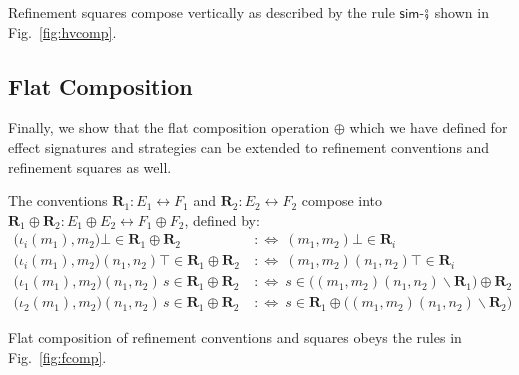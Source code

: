 \documentclass[acmsmall,screen,review,nonacm]{acmart}
\newcommand{\kw}[1]{\ensuremath{ \mathsf{#1} }}
\begin{document}
\begin{theorem} \label{thm:vcomp}
Refinement squares compose vertically
as described by the rule $\kw{sim}$-$\fatsemi$
shown in Fig.~\ref{fig:hvcomp}.
\end{theorem}


\subsection{Flat Composition} %

Finally,
we show that the flat composition operation $\oplus$
which we have defined for effect signatures and strategies
can be extended to refinement conventions and refinement squares as well.

\begin{definition}
The conventions
$\mathbf{R}_1 : E_1 \leftrightarrow F_1$ and
$\mathbf{R}_2 : E_2 \leftrightarrow F_2$
compose into
$\mathbf{R}_1 \oplus \mathbf{R}_2 : E_1 \oplus E_2 \leftrightarrow F_1 \oplus F_2$,
defined by:
\begin{align*}
  \bigl(\iota_i(m_1), m_2\bigr)\bot \in \mathbf{R}_1 \oplus \mathbf{R}_2
  \:&:\Leftrightarrow\:
  (m_1,m_2)\bot \in \mathbf{R}_i
\\
  \bigl(\iota_i(m_1), m_2\bigr)(n_1,n_2)\top \in \mathbf{R}_1 \oplus \mathbf{R}_2
  \:&:\Leftrightarrow\:
  (m_1,m_2)(n_1,n_2)\top \in \mathbf{R}_i
\\
  \bigl(\iota_1(m_1), m_2 \bigr)(n_1,n_2) \, s \in \mathbf{R}_1 \oplus \mathbf{R}_2
  \:&:\Leftrightarrow\:
  s \in \bigl( (m_1,m_2)(n_1,n_2) \backslash \mathbf{R}_1 \bigr) \oplus \mathbf{R}_2
\\
  \bigl(\iota_2(m_1), m_2 \bigr)(n_1,n_2) \, s \in \mathbf{R}_1 \oplus \mathbf{R}_2
  \:&:\Leftrightarrow\:
  s \in \mathbf{R}_1 \oplus \bigl( (m_1,m_2)(n_1,n_2) \backslash \mathbf{R}_2 \bigr)
\end{align*}
\end{definition}

\begin{theorem}%
Flat composition of refinement conventions and squares
obeys the rules in Fig.~\ref{fig:fcomp}.
\end{theorem}

\end{document}
